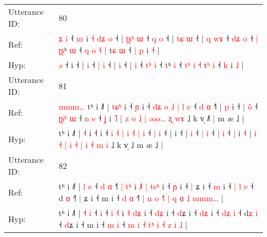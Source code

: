 \documentclass[10pt]{article}
\DeclareRobustCommand{\hl}[1]{{\textcolor{red}{#1}}}
\begin{document}
\begin{longtable}{ll}
 \\
\midrule
Utterance ID: & 80 \\
Ref: & \hl{ʑ}\hl{ }\hl{i} ˧\hl{ }\hl{m} i\hl{ }\hl{˧}\hl{ }\hl{d}\hl{ʑ}\hl{ }\hl{o} ˧ |\hl{ }\hl{ʈ}\hl{ʂ}\hl{ʰ} \hl{ɯ} ˧ \hl{q} \hl{o} ˧ |\hl{ }\hl{t}\hl{ɕ} \hl{ɯ} ˧ |\hl{ }\hl{q} \hl{w}\hl{ɤ} ˧ \hl{d}\hl{ʑ} \hl{o} ˧\hl{ }\hl{|} \hl{ʈ}\hl{ʂ}ʰ \hl{ɯ} ˧ \hl{q}\hl{ }\hl{o} \hl{˧} \hl{|} t\hl{ɕ} \hl{ɯ} ˧\hl{ }\hl{|} \hl{p} i \hl{˧} |
 \\
Hyp: & \hl{}\hl{}\hl{ə} ˧\hl{}\hl{} i\hl{}\hl{}\hl{}\hl{}\hl{}\hl{}\hl{} ˧ |\hl{}\hl{}\hl{}\hl{} \hl{i} ˧ \hl{|} \hl{i} ˧ |\hl{}\hl{}\hl{} \hl{i} ˧ |\hl{}\hl{} \hl{}\hl{i} ˧ \hl{t}\hl{ʰ} \hl{i} ˧\hl{}\hl{} \hl{}\hl{t}ʰ \hl{i} ˧ \hl{}\hl{t}\hl{ʰ} \hl{i} \hl{˧} t\hl{ʰ} \hl{i} ˧\hl{}\hl{} \hl{k} i \hl{˩} |
 \\
\midrule
Utterance ID: & 81 \\
Ref: & \hl{m}\hl{m}\hl{m}\hl{…}\hl{ }tʰ i ˩˥ | \hl{t}\hl{ɕ}\hl{ʰ} i ˧\hl{ }\hl{ɲ} i ˧ \hl{}\hl{d}\hl{ʑ} \hl{o} \hl{˩} \hl{|} \hl{l} \hl{e} ˧ \hl{d} \hl{ɑ} ˧\hl{˥} |\hl{ }\hl{p} i ˧ | \hl{o}\hl{̃} ˧ \hl{ʈ}\hl{ʂ}\hl{ʰ} \hl{ɯ} ˧ \hl{n} \hl{e} ˧ \hl{ʝ} i \hl{˥} | \hl{z} \hl{o} \hl{˩} \hl{|} \hl{}\hl{ə}\hl{ə}\hl{ə}\hl{…} \hl{ʐ} \hl{}\hl{w}\hl{ɤ} ˩ k v̩ ˩\hl{˥}\hl{ }\hl{|} m æ ˩ |
 \\
Hyp: & \hl{}\hl{}\hl{}\hl{}\hl{}tʰ i ˩˥ | \hl{}\hl{}\hl{˧} i ˧\hl{}\hl{} i ˧ \hl{i}\hl{ }\hl{˧} \hl{|} \hl{i} \hl{˧} \hl{|} \hl{i} ˧ \hl{|} \hl{i} ˧\hl{} |\hl{}\hl{} i ˧ | \hl{}\hl{i} ˧ \hl{}\hl{}\hl{|} \hl{i} ˧ \hl{|} \hl{i} ˧ \hl{|} i \hl{˧} | \hl{i} \hl{˧} \hl{|} \hl{i} \hl{˧}\hl{ }\hl{|}\hl{ }\hl{i} \hl{˧} \hl{m}\hl{ }\hl{i} ˩ k v̩ ˩\hl{}\hl{}\hl{} m æ ˩ |
 \\
\midrule
Utterance ID: & 82 \\
Ref: & tʰ i ˩˥ | \hl{l} \hl{e} ˧\hl{ }\hl{d} \hl{ɑ} ˧\hl{˥} \hl{|} \hl{t}\hl{ʰ} i\hl{ }\hl{˩}\hl{˥} \hl{|} \hl{t}\hl{s}\hl{ʰ} i ˧ \hl{}\hl{ɲ} i ˧ \hl{|}\hl{ }ʑ i ˧ \hl{}\hl{m} i ˧ \hl{|}\hl{ }\hl{l} \hl{e} ˧ d\hl{} \hl{ɑ} ˧\hl{˥} \hl{|}\hl{ }ʑ i ˧ m i ˧ \hl{d} \hl{ɑ} ˧\hl{˥} \hl{|} \hl{n} \hl{o} \hl{˧}\hl{˥} \hl{|} \hl{q} \hl{ɑ} \hl{˩} \hl{m}\hl{m}\hl{m}\hl{…} |
 \\
Hyp: & tʰ i ˩˥ | \hl{˧} \hl{i} ˧\hl{}\hl{} \hl{i} ˧\hl{} \hl{i} \hl{}\hl{˧} i\hl{}\hl{}\hl{} \hl{˧} \hl{}\hl{d}\hl{ʑ} i ˧ \hl{d}\hl{ʑ} i ˧ \hl{}\hl{d}ʑ i ˧ \hl{d}\hl{ʑ} i ˧ \hl{}\hl{d}\hl{ʑ} \hl{i} ˧ d\hl{ʑ} \hl{i} ˧\hl{} \hl{}\hl{d}ʑ i ˧ m i ˧ \hl{m} \hl{i} ˧\hl{} \hl{m} \hl{i} \hl{˧} \hl{t}\hl{ʰ} \hl{i} \hl{˧} \hl{z} \hl{i} \hl{}\hl{}\hl{}\hl{˩} |
 \\

\end{longtable}
\end{document}
